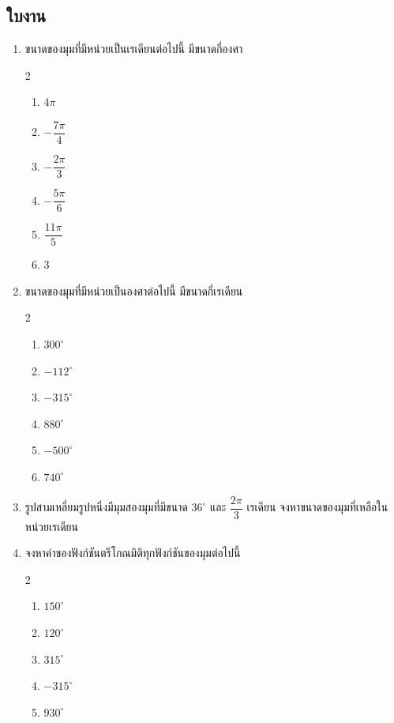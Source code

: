 \subsection*{ใบงาน}
\begin{enumerate}[label=\arabic*., leftmargin=*, itemsep=1em]
	\item ขนาดของมุมที่มีหน่วยเป็นเรเดียนต่อไปนี้ มีขนาดกี่องศา
	\begin{multicols}{2}
		\begin{enumerate}[label=\theenumi\arabic*), leftmargin=1.5em, itemsep=0.6em]
			\everymath{\displaystyle}
			\item $4\pi$
			\item $-\dfrac{7\pi}{4}$
			\item $-\dfrac{2\pi}{3}$
			\item $-\dfrac{5\pi}{6}$
			\item $\dfrac{11\pi}{5}$
			\item 3
		\end{enumerate}
	\end{multicols}
	
	\item ขนาดของมุมที่มีหน่วยเป็นองศาต่อไปนี้ มีขนาดกี่เรเดียน
	\begin{multicols}{2}
		\begin{enumerate}[label=\theenumi\arabic*), leftmargin=1.5em, itemsep=0.6em]
			\everymath{\displaystyle}
			\item $300^{\circ}$
			\item $-112^{\circ}$
			\item $-315^{\circ}$
			\item $880^{\circ}$
			\item $-500^{\circ}$
			\item $740^{\circ}$
		\end{enumerate}
	\end{multicols}
	
	\item รูปสามเหลี่ยมรูปหนึ่งมีมุมสองมุมที่มีขนาด $36^{\circ}$ และ $\dfrac{2\pi}{3}$ เรเดียน จงหาขนาดของมุมที่เหลือในหน่วยเรเดียน
	
	\item จงหาค่าของฟังก์ชันตรีโกณมิติทุกฟังก์ชันของมุมต่อไปนี้
	\begin{multicols}{2}
		\begin{enumerate}[label=\theenumi\arabic*), leftmargin=1.5em, itemsep=0.6em]
			\everymath{\displaystyle}
			\item $150^{\circ}$
			\item $120^{\circ}$
			\item $315^{\circ}$
			\item $-315^{\circ}$
			\item $930^{\circ}$
		\end{enumerate}
	\end{multicols}
	

\end{enumerate}
